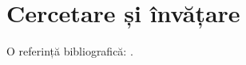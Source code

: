 \documentclass{thesis}
\begin{document}
\section{Cercetare și învățare}
O referință bibliografică: \cite{knuth1984}.
\printbibliography
\end{document}
